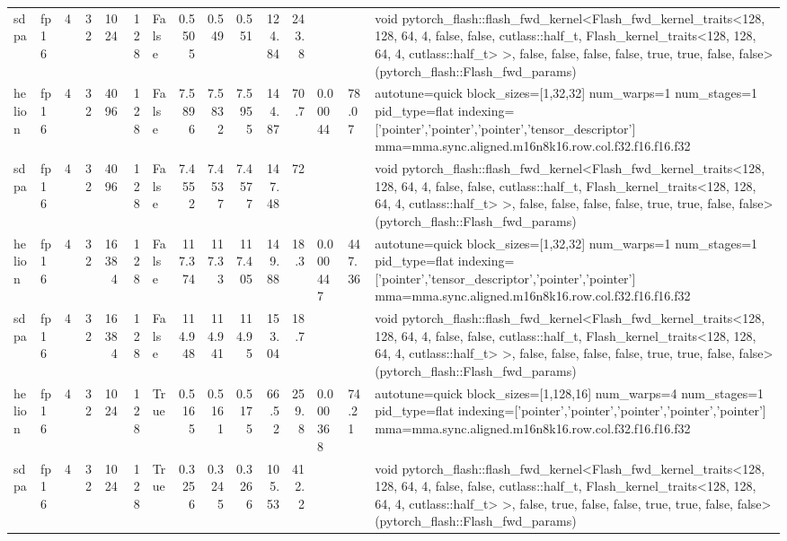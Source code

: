 \begin{table}[htbp]
\begin{tabular}{llrrrrlrrrrrlll}
    sdpa & fp16 & 4 & 32 & 1024 & 128 & False & 0.5505 & 0.549 & 0.551 & 124.84 & 243.8 &  &  & void pytorch\_flash::flash\_fwd\_kernel<Flash\_fwd\_kernel\_traits<128, 128, 64, 4, false, false, cutlass::half\_t, Flash\_kernel\_traits<128, 128, 64, 4, cutlass::half\_t> >, false, false, false, false, true, true, false, false>(pytorch\_flash::Flash\_fwd\_params) \\
    helion & fp16 & 4 & 32 & 4096 & 128 & False & 7.5896 & 7.5832 & 7.5955 & 144.87 & 70.7 & 0.00044 & 78.07 & autotune=quick block\_sizes=[1,32,32] num\_warps=1 num\_stages=1 pid\_type=flat indexing=['pointer','pointer','pointer','tensor\_descriptor'] mma=mma.sync.aligned.m16n8k16.row.col.f32.f16.f16.f32 \\
    sdpa & fp16 & 4 & 32 & 4096 & 128 & False & 7.4552 & 7.4537 & 7.4577 & 147.48 & 72 &  &  & void pytorch\_flash::flash\_fwd\_kernel<Flash\_fwd\_kernel\_traits<128, 128, 64, 4, false, false, cutlass::half\_t, Flash\_kernel\_traits<128, 128, 64, 4, cutlass::half\_t> >, false, false, false, false, true, true, false, false>(pytorch\_flash::Flash\_fwd\_params) \\
    helion & fp16 & 4 & 32 & 16384 & 128 & False & 117.374 & 117.33 & 117.405 & 149.88 & 18.3 & 0.000447 & 447.36 & autotune=quick block\_sizes=[1,32,32] num\_warps=1 num\_stages=1 pid\_type=flat indexing=['pointer','tensor\_descriptor','pointer','pointer'] mma=mma.sync.aligned.m16n8k16.row.col.f32.f16.f16.f32 \\
    sdpa & fp16 & 4 & 32 & 16384 & 128 & False & 114.948 & 114.941 & 114.95 & 153.04 & 18.7 &  &  & void pytorch\_flash::flash\_fwd\_kernel<Flash\_fwd\_kernel\_traits<128, 128, 64, 4, false, false, cutlass::half\_t, Flash\_kernel\_traits<128, 128, 64, 4, cutlass::half\_t> >, false, false, false, false, true, true, false, false>(pytorch\_flash::Flash\_fwd\_params) \\
    helion & fp16 & 4 & 32 & 1024 & 128 & True & 0.5165 & 0.5161 & 0.5175 & 66.52 & 259.8 & 0.000368 & 74.21 & autotune=quick block\_sizes=[1,128,16] num\_warps=4 num\_stages=1 pid\_type=flat indexing=['pointer','pointer','pointer','pointer','pointer'] mma=mma.sync.aligned.m16n8k16.row.col.f32.f16.f16.f32 \\
    sdpa & fp16 & 4 & 32 & 1024 & 128 & True & 0.3256 & 0.3245 & 0.3266 & 105.53 & 412.2 &  &  & void pytorch\_flash::flash\_fwd\_kernel<Flash\_fwd\_kernel\_traits<128, 128, 64, 4, false, false, cutlass::half\_t, Flash\_kernel\_traits<128, 128, 64, 4, cutlass::half\_t> >, false, true, false, false, true, true, false, false>(pytorch\_flash::Flash\_fwd\_params) \\

\end{tabular}
\end{table}
